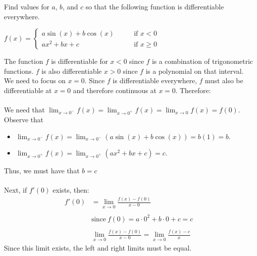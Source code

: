 \documentclass[nooutcomes,handout]{ximera}
\begin{document}
\begin{problem}
Find values for $a$, $b$, and $c$ so that the following function is differentiable everywhere.

$f(x) =   \left\{ \begin{array}{cl}
	a \sin(x) + b \cos(x)		 	&	\qquad \text{if } x < 0					\\
	ax^2 + bx + c   				&	\qquad \text{if } x \geq 0	 \end{array} \right.  $
		\begin{freeResponse}
		The function $f$ is differentiable for $x<0$ since $f$ is a combination of trigonometric functions.  $f$ is also differentiable $x>0$ since $f$ is a polynomial on that interval.  We need to focus on $x=0$.  Since $f$ is differentiable everywhere, $f$ must also be differentiable at $x=0$ and therefore continuous at $x=0$.  Therefore: \\\\
We need that $\lim_{x \to 0^-} f(x) = \lim_{x \to 0^+} f(x)=\lim_{x \to 0} f(x)=f(0)$.  Observe that
		
		\begin{itemize}
		
		\item $\lim_{x \to 0^-} f(x) 
		= \lim_{x \to 0^-} (a\sin(x) + b\cos(x))
		= b(1) = b$.
		
		\item  $ \lim_{x \to 0^+} f(x)
		= \lim_{x \to 0^+} (ax^2 + bx + c)
		= c$.
		
		\end{itemize}
		
		Thus, we must have that $b = c$\\\\
		Next, if $f'(0)$ exists, then:
		\begin{align*}
		f'(0)&=\lim_{x\to 0} \frac{f(x)-f(0)}{x-0}\\\\
		& \text{since}\ f(0)=a \cdot 0^2+b \cdot 0 +c =c\\\\
		& \lim_{x\to 0} \frac{f(x)-f(0)}{x-0}=\lim_{x\to 0} \frac{f(x)-c}{x}
		\end{align*}
		Since this limit exists, the left and right limits must be equal.
		

\end{freeResponse}
\end{problem}
\end{document}

